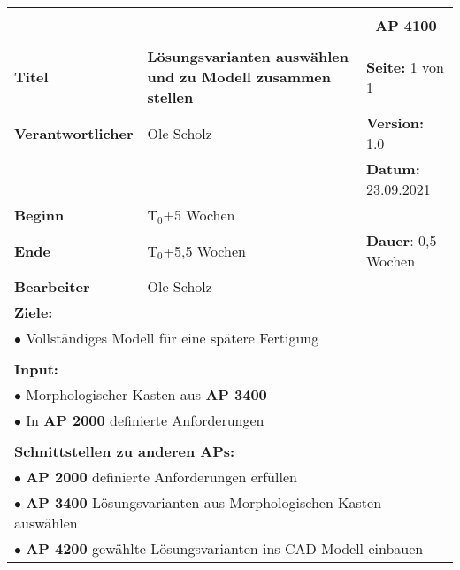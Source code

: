 \clearpage
\begin{table}[!h]
	\begin{center}
		\begin{tabular}{|p{35mm}||p{55mm}|p{50mm}||p{40mm}|}
			\hline
			\multicolumn{3}{|l||}{\textbf{}} & \multicolumn{1}{c|}{}\\
			\multicolumn{3}{|l||}{\textbf{}} & \multicolumn{1}{c|}{\textbf{AP 4100}}\\
			\multicolumn{3}{|l||}{\textbf{}} & \multicolumn{1}{c|}{}\\
			\hline\hline
			\textbf{Titel} & \multicolumn{2}{p{7cm}||}{\textbf{Lösungsvarianten auswählen und zu Modell zusammen stellen}} 
			& \textbf{Seite:} 1 von 1\\
			\hline
			\textbf{Verantwortlicher} & \multicolumn{2}{l||}{Ole Scholz} & \textbf{Version:} 1.0\\
			\hline
			\multicolumn{3}{|l||}{} & \textbf{Datum:} 23.09.2021\\
			\hline\hline
			\textbf{Beginn} & \multicolumn{2}{l||}{T$_0$+5 Wochen} & \\
			\hline
			\textbf{Ende} & \multicolumn{2}{l||}{T$_0$+5,5 Wochen} & \textbf{Dauer}: 0,5 Wochen\\
			\hline\hline
			\textbf{Bearbeiter} & \multicolumn{3}{l|}{Ole Scholz}\\
			\hline\hline
			\multicolumn{4}{|p{150mm}|}{\textbf{Ziele:}}\\
			\multicolumn{4}{|p{150mm}|}{$\bullet$ Vollständiges Modell für eine spätere Fertigung}\\
			\multicolumn{4}{|p{150mm}|}{}\\
			\multicolumn{4}{|p{150mm}|}{\textbf{Input:}}\\
			\multicolumn{4}{|p{150mm}|}{$\bullet$ Morphologischer Kasten aus \textbf{AP 3400}}\\
			\multicolumn{4}{|p{150mm}|}{$\bullet$ In \textbf{AP 2000} definierte Anforderungen}\\
			\multicolumn{4}{|p{150mm}|}{}\\
			\multicolumn{4}{|p{150mm}|}{\textbf{Schnittstellen zu anderen APs:}}\\
			\multicolumn{4}{|p{150mm}|}{$\bullet$ \textbf{AP 2000} definierte Anforderungen erfüllen}\\
			\multicolumn{4}{|p{150mm}|}{$\bullet$ \textbf{AP 3400} Lösungsvarianten aus Morphologischen Kasten auswählen}\\
			\multicolumn{4}{|p{150mm}|}{$\bullet$ \textbf{AP 4200} gewählte Lösungsvarianten ins CAD-Modell einbauen}\\

\end{tabular}
\end{center}
\end{table}
